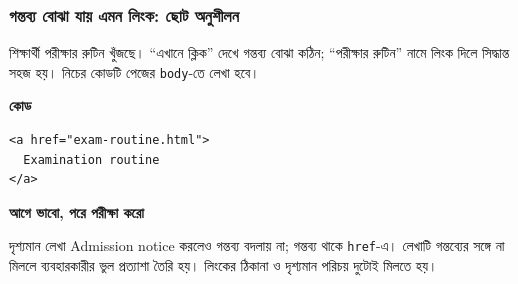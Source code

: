 \subsubsection{গন্তব্য বোঝা যায় এমন লিংক: ছোট অনুশীলন}
শিক্ষার্থী পরীক্ষার রুটিন খুঁজছে। ``এখানে ক্লিক'' দেখে গন্তব্য বোঝা কঠিন; ``পরীক্ষার রুটিন'' নামে লিংক দিলে সিদ্ধান্ত সহজ হয়। নিচের কোডটি পেজের \texttt{body}-তে লেখা হবে।
\par\noindent\begin{minipage}[t]{.50\linewidth}\vspace{0pt}\small
\textbf{\color{chFourTeal}কোড}\par
\begin{verbatim}
<a href="exam-routine.html">
  Examination routine
</a>
\end{verbatim}
\end{minipage}\hfill
\begin{minipage}[t]{.46\linewidth}\vspace{0pt}\small
\textbf{\color{chFourTeal}আগে ভাবো, পরে পরীক্ষা করো}\par
দৃশ্যমান লেখা Admission notice করলেও গন্তব্য বদলায় না; গন্তব্য থাকে \texttt{href}-এ। লেখাটি গন্তব্যের সঙ্গে না মিললে ব্যবহারকারীর ভুল প্রত্যাশা তৈরি হয়। লিংকের ঠিকানা ও দৃশ্যমান পরিচয় দুটোই মিলতে হয়।
\end{minipage}\par
